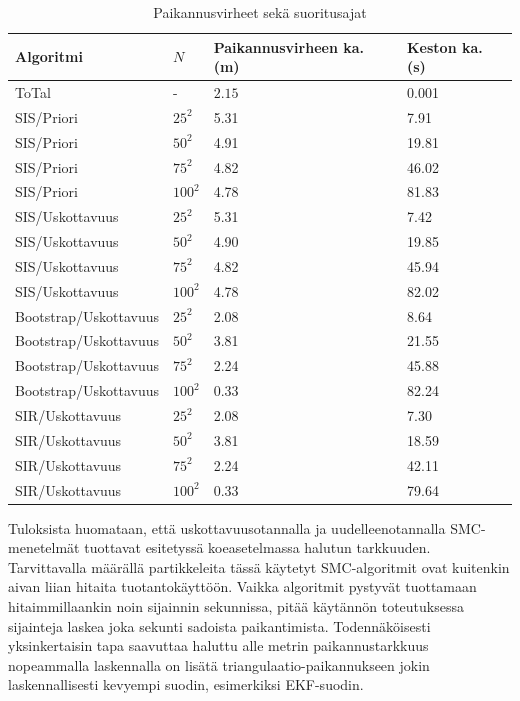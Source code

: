 \documentclass[
  12pt,
  a4paper, twoside]{book}
\begin{document}
\def\arraystretch{1.25} 
\begin{table}[H]
\centering
\begin{tabular}{|l|l|l|l|}
\hline
Algoritmi & $N$ & Paikannusvirheen ka. (m) & Keston ka. (s)\\
\hline
ToTal & - & $2.15$ & 0.001\\
SIS/Priori & $25^2$ & 5.31 & 7.91\\
SIS/Priori & $50^2$ & 4.91 & 19.81\\
SIS/Priori & $75^2$ & 4.82 & 46.02 \\
SIS/Priori & $100^2$ & 4.78 & 81.83 \\
SIS/Uskottavuus & $25^2$ & 5.31 & 7.42\\
SIS/Uskottavuus & $50^2$ & 4.90 & 19.85\\
SIS/Uskottavuus & $75^2$ & 4.82 & 45.94\\
SIS/Uskottavuus & $100^2$ & 4.78 & 82.02\\
Bootstrap/Uskottavuus & $25^2$ & 2.08 & 8.64\\
Bootstrap/Uskottavuus & $50^2$ & 3.81 & 21.55\\
Bootstrap/Uskottavuus & $75^2$ & 2.24 & 45.88\\
Bootstrap/Uskottavuus & $100^2$ & 0.33 & 82.24\\
SIR/Uskottavuus & $25^2$ & 2.08 & 7.30\\
SIR/Uskottavuus & $50^2$ & 3.81 & 18.59\\
SIR/Uskottavuus & $75^2$ & 2.24 & 42.11\\
SIR/Uskottavuus & $100^2$ & 0.33 & 79.64\\
\hline
\end{tabular}
\caption{Paikannusvirheet sekä suoritusajat}
\label{tab:paikannusvirheet}
\end{table}

Tuloksista huomataan, että uskottavuusotannalla ja uudelleenotannalla SMC-menetelmät tuottavat esitetyssä koeasetelmassa halutun tarkkuuden. Tarvittavalla määrällä partikkeleita tässä käytetyt SMC-algoritmit ovat kuitenkin aivan liian hitaita tuotantokäyttöön. Vaikka algoritmit pystyvät tuottamaan hitaimmillaankin noin sijainnin sekunnissa, pitää käytännön toteutuksessa sijainteja laskea joka sekunti sadoista paikantimista. Todennäköisesti yksinkertaisin tapa saavuttaa haluttu alle metrin paikannustarkkuus nopeammalla laskennalla on lisätä triangulaatio-paikannukseen jokin laskennallisesti kevyempi suodin, esimerkiksi EKF-suodin.
\end{document}
